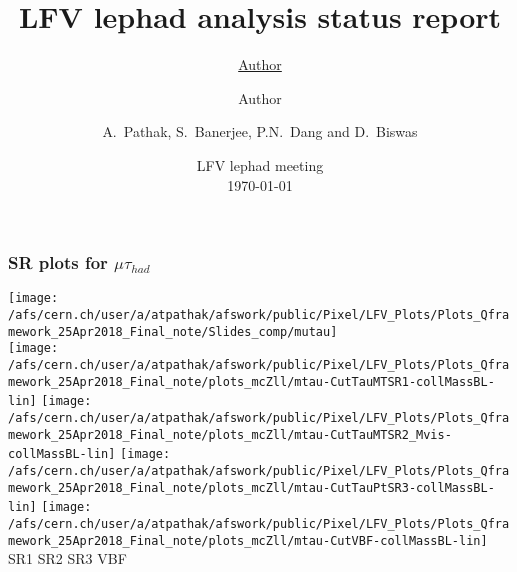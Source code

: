 \documentclass{beamer}
\title{LFV lephad analysis status report} %
\author{\underline{Author} \and Author} %
\author{A.~Pathak, S.~Banerjee, P.N.~Dang and D.~Biswas}
\institute{\begin{minipage}{0.5\textwidth}\centering
\texttt{[image: /afs/cern.ch/user/s/swaban/public/university-of-louisville-logo.png]}
\end{minipage}}
\date{{LFV lephad meeting}\\\today\\} %
\begin{document}
\begin{frame}
\titlepage %
\end{frame}
\begin{frame}
\frametitle{SR plots for $\mu\tau_{had}$}
\begin{normalsize}
\vspace*{0.2cm}
\texttt{[image: /afs/cern.ch/user/a/atpathak/afswork/public/Pixel/LFV\_Plots/Plots\_Qframework\_25Apr2018\_Final\_note/Slides\_comp/mutau]}\\
\texttt{[image: /afs/cern.ch/user/a/atpathak/afswork/public/Pixel/LFV\_Plots/Plots\_Qframework\_25Apr2018\_Final\_note/plots\_mcZll/mtau-CutTauMTSR1-collMassBL-lin]}
\texttt{[image: /afs/cern.ch/user/a/atpathak/afswork/public/Pixel/LFV\_Plots/Plots\_Qframework\_25Apr2018\_Final\_note/plots\_mcZll/mtau-CutTauMTSR2\_Mvis-collMassBL-lin]}
\texttt{[image: /afs/cern.ch/user/a/atpathak/afswork/public/Pixel/LFV\_Plots/Plots\_Qframework\_25Apr2018\_Final\_note/plots\_mcZll/mtau-CutTauPtSR3-collMassBL-lin]}
\texttt{[image: /afs/cern.ch/user/a/atpathak/afswork/public/Pixel/LFV\_Plots/Plots\_Qframework\_25Apr2018\_Final\_note/plots\_mcZll/mtau-CutVBF-collMassBL-lin]}\\
\hspace{0.5in}SR1 
\hspace{0.75in}SR2
\hspace{0.75in}SR3
\hspace{0.75in}VBF
\end{normalsize}
\end{frame}
\end{document}
